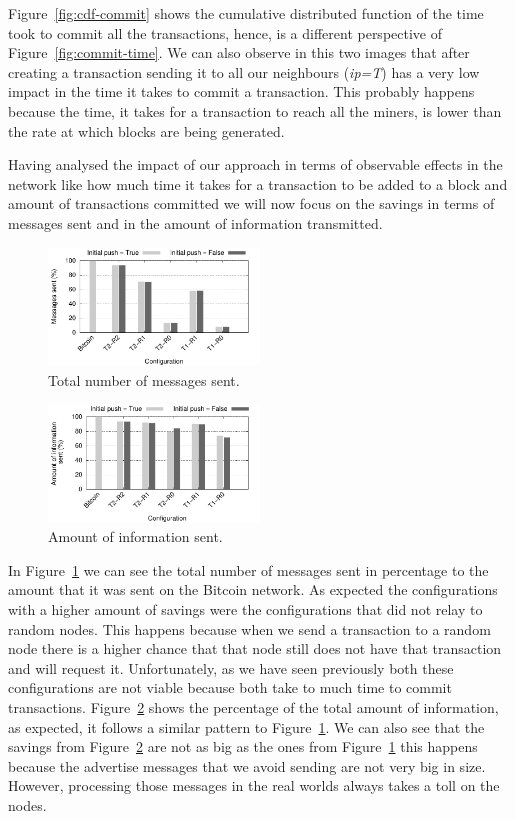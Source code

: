 \documentclass{dads}   %
\begin{document}
Figure~\ref{fig:cdf-commit} shows the cumulative distributed function of the time took to commit all the transactions, hence, is a different perspective of Figure~\ref{fig:commit-time}. We can also observe in this two images that after creating a transaction sending it to all our neighbours (\emph{ip=T}) has a very low impact in the time it takes to commit a transaction. This probably happens because the time, it takes for a transaction to reach all the miners, is lower than the rate at which blocks are being generated.

Having analysed the impact of our approach in terms of observable effects in the network like how much time it takes for a transaction to be added to a block and amount of transactions committed we will now focus on the savings in terms of messages sent and in the amount of information transmitted.
\begin{figure}[t]
\centering
\includegraphics[width=0.5\textwidth]{plots/msg-sent.pdf}
\caption{Total number of messages sent.}
\label{fig:msg-sent}
\end{figure}

\begin{figure}[t]
\centering
\includegraphics[width=0.5\textwidth]{plots/mb-sent.pdf}
\caption{Amount of information sent.}
\label{fig:mb-sent}
\end{figure}

In Figure~\ref{fig:msg-sent} we can see the total number of messages sent in percentage to the amount that it was sent on the Bitcoin network. As expected the configurations with a higher amount of savings were the configurations that did not relay to random nodes. This happens because when we send a transaction to a random node there is a higher chance that that node still does not have that transaction and will request it. Unfortunately, as we have seen previously both these configurations are not viable because both take to much time to commit transactions. Figure~\ref{fig:mb-sent} shows the percentage of the total amount of information, as expected, it follows a similar pattern to Figure~\ref{fig:msg-sent}. We can also see that the savings from Figure~\ref{fig:mb-sent} are not as big as the ones from Figure~\ref{fig:msg-sent} this happens because the advertise messages that we avoid sending are not very big in size. However, processing those messages in the real worlds always takes a toll on the nodes.
\end{document}
